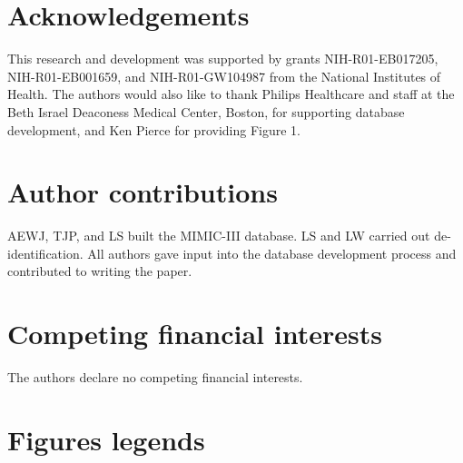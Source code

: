\documentclass[english]{article}
\begin{document}



\section*{Acknowledgements}


This research and development was supported by grants NIH-R01-EB017205, NIH-R01-EB001659, and NIH-R01-GW104987 from the National Institutes of Health. The authors would also like to thank Philips Healthcare and staff at the Beth Israel Deaconess Medical Center, Boston, for supporting database development, and Ken Pierce for providing Figure 1.

\section*{Author contributions}

AEWJ, TJP, and LS built the MIMIC-III database. LS and LW carried out de-identification. All authors gave input into the database development process and contributed to writing the paper. 

\section*{Competing financial interests}

The authors declare no competing financial interests.

\section*{Figures legends}

\end{document}
